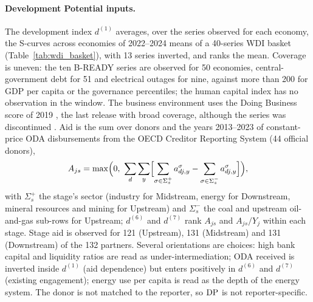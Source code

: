 \paragraph{Development Potential inputs.} The development index $d^{(1)}$ averages, over the series
observed for each economy, the S-curves across economies of 2022--2024 means of a 40-series WDI
basket \citep{worldbank2026wdi} (Table~\ref{tab:wdi_basket}), with 13 series inverted, and ranks the
mean. Coverage is uneven: the ten B-READY series are observed for 50 economies, central-government
debt for 51 and electrical outages for nine, against more than 200 for GDP per capita or the
governance percentiles; the human capital index has no observation in the window. The business
environment uses the Doing Business score of 2019 \citep{worldbank2020doing}, the last release with
broad coverage, although the series was discontinued \citep{worldbank2021discontinue}. Aid is the
sum over donors and the years 2013--2023 of constant-price ODA disbursements from the OECD Creditor
Reporting System \citep{oecd2026crs} (44 official donors),
\begin{equation}\label{eq:dp_aid}
  A_{js}=\max\Bigl(0,\ \sum_{d}\sum_{y}\Bigl[\sum_{\sigma\in\Sigma^{+}_{s}}a^{\sigma}_{dj,y}
  -\sum_{\sigma\in\Sigma^{-}_{s}}a^{\sigma}_{dj,y}\Bigr]\Bigr),
\end{equation}
with $\Sigma^{+}_{s}$ the stage's sector (industry for Midstream, energy for Downstream, mineral
resources and mining for Upstream) and $\Sigma^{-}_{s}$ the coal and upstream oil-and-gas sub-rows
for Upstream; $d^{(6)}$ and $d^{(7)}$ rank $A_{js}$ and $A_{js}/Y_j$ within each stage. Stage aid is
observed for 121 (Upstream), 131 (Midstream) and 131 (Downstream) of the 132 partners. Several
orientations are choices: high bank capital and liquidity ratios are read as under-intermediation;
ODA received is inverted inside $d^{(1)}$ (aid dependence) but enters positively in $d^{(6)}$ and
$d^{(7)}$ (existing engagement); energy use per capita is read as the depth of the energy system.
The donor is not matched to the reporter, so $\mathrm{DP}$ is not reporter-specific.

